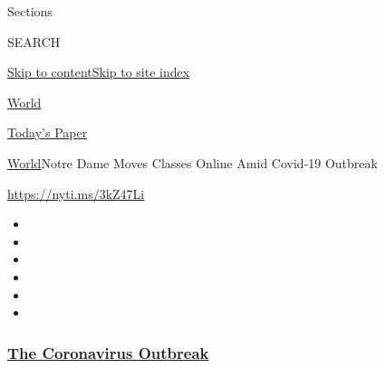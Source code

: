 Sections

SEARCH

\protect\hyperlink{site-content}{Skip to
content}\protect\hyperlink{site-index}{Skip to site index}

\href{https://www.nytimes3xbfgragh.onion/section/world}{World}

\href{https://myaccount.nytimes3xbfgragh.onion/auth/login?response_type=cookie\&client_id=vi}{}

\href{https://www.nytimes3xbfgragh.onion/section/todayspaper}{Today's
Paper}

\href{/section/world}{World}\textbar{}Notre Dame Moves Classes Online
Amid Covid-19 Outbreak

\url{https://nyti.ms/3kZ47Li}

\begin{itemize}
\item
\item
\item
\item
\item
\item
\end{itemize}

\hypertarget{the-coronavirus-outbreak}{%
\subsubsection{\texorpdfstring{\href{https://www.nytimes3xbfgragh.onion/news-event/coronavirus?name=styln-coronavirus-national\&region=TOP_BANNER\&variant=undefined\&block=storyline_menu_recirc\&action=click\&pgtype=Article\&impression_id=b1ed59b0-e381-11ea-8f04-cd5180a6ec60}{The
Coronavirus
Outbreak}}{The Coronavirus Outbreak}}\label{the-coronavirus-outbreak}}

